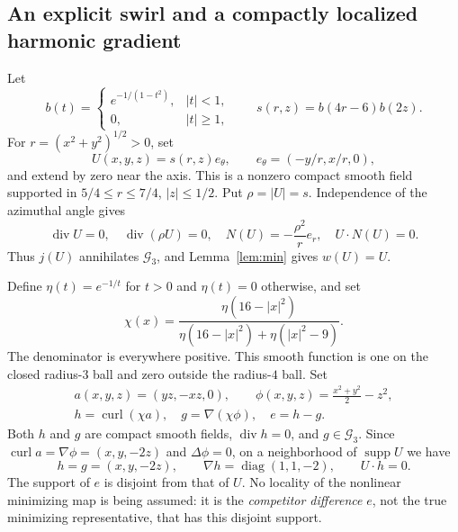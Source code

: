 \documentclass[11pt,a4paper]{article}
\theoremstyle{definition}
\newcommand{\G}{\mathcal G_3}
\DeclareMathOperator{\diver}{div}
\DeclareMathOperator{\curl}{curl}
\DeclareMathOperator{\supp}{supp}
\begin{document}
\subsection{An explicit swirl and a compactly localized harmonic gradient}
Let
\[
 b(t)=\begin{cases}e^{-1/(1-t^2)},&|t|<1,\\0,&|t|\ge1,\end{cases}
 \qquad s(r,z)=b(4r-6)b(2z).
\]
For $r=(x^2+y^2)^{1/2}>0$, set
\begin{equation}\label{eq:swirl}
 U(x,y,z)=s(r,z)e_\theta,\qquad e_\theta=(-y/r,x/r,0),
\end{equation}
and extend by zero near the axis. This is a nonzero compact smooth field supported in $5/4\le r\le7/4$, $|z|\le1/2$. Put $\rho=|U|=s$. Independence of the azimuthal angle gives
\begin{equation}\label{eq:swirl-properties}
 \diver U=0,\quad\diver(\rho U)=0,\quad
 N(U)=-\frac{\rho^2}{r}e_r,\quad U\cdot N(U)=0.
\end{equation}
Thus $j(U)$ annihilates $\G$, and Lemma~\ref{lem:min} gives $w(U)=U$.

Define $\eta(t)=e^{-1/t}$ for $t>0$ and $\eta(t)=0$ otherwise, and set
\[
 \chi(x)=\frac{\eta(16-|x|^2)}{\eta(16-|x|^2)+\eta(|x|^2-9)}.
\]
The denominator is everywhere positive. This smooth function is one on the closed radius-$3$ ball and zero outside the radius-$4$ ball. Set
\begin{equation}\label{eq:hg}
 \begin{gathered}
 a(x,y,z)=(yz,-xz,0),\qquad
 \phi(x,y,z)=\frac{x^2+y^2}{2}-z^2,\\
 h=\curl(\chi a),\quad g=\nabla(\chi\phi),\quad e=h-g.
 \end{gathered}
\end{equation}
Both $h$ and $g$ are compact smooth fields, $\diver h=0$, and $g\in\G$. Since $\curl a=\nabla\phi=(x,y,-2z)$ and $\Delta\phi=0$, on a neighborhood of $\supp U$ we have
\begin{equation}\label{eq:hlocal}
 h=g=(x,y,-2z),\qquad \nabla h=\operatorname{diag}(1,1,-2),\qquad U\cdot h=0.
\end{equation}
The support of $e$ is disjoint from that of $U$. No locality of the nonlinear minimizing map is being assumed: it is the \emph{competitor difference} $e$, not the true minimizing representative, that has this disjoint support.
\end{document}
